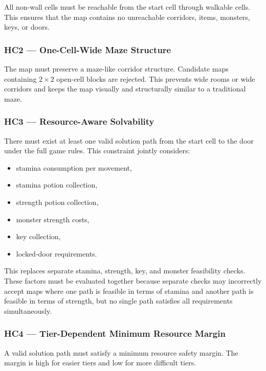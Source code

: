 \documentclass[11pt]{article}
\begin{document}
All non-wall cells must be reachable from the start cell through walkable cells. This ensures that the map contains no unreachable corridors, items, monsters, keys, or doors.

\subsubsection{HC2 --- One-Cell-Wide Maze Structure}

The map must preserve a maze-like corridor structure. Candidate maps containing $2 \times 2$ open-cell blocks are rejected. This prevents wide rooms or wide corridors and keeps the map visually and structurally similar to a traditional maze.

\subsubsection{HC3 --- Resource-Aware Solvability}

There must exist at least one valid solution path from the start cell to the door under the full game rules. This constraint jointly considers:

\begin{itemize}[noitemsep]
    \item stamina consumption per movement,
    \item stamina potion collection,
    \item strength potion collection,
    \item monster strength costs,
    \item key collection,
    \item locked-door requirements.
\end{itemize}

This replaces separate stamina, strength, key, and monster feasibility checks. These factors must be evaluated together because separate checks may incorrectly accept maps where one path is feasible in terms of stamina and another path is feasible in terms of strength, but no single path satisfies all requirements simultaneously.

\subsubsection{HC4 --- Tier-Dependent Minimum Resource Margin}

A valid solution path must satisfy a minimum resource safety margin. The margin is high for easier tiers and low for more difficult tiers.
\end{document}
